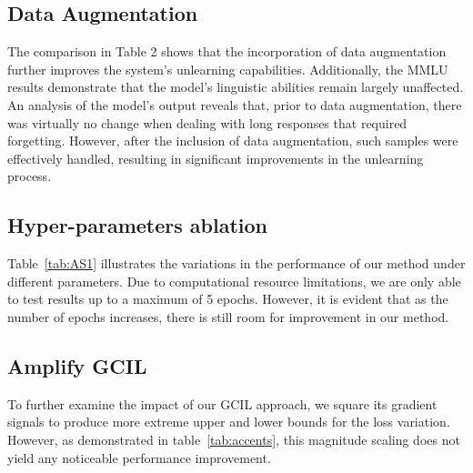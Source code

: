 \documentclass[11pt]{article}
\begin{document}
\subsection{Data Augmentation} 

The comparison in Table 2 shows that the incorporation of data augmentation further improves the system's unlearning capabilities. Additionally, the MMLU results demonstrate that the model’s linguistic abilities remain largely unaffected. An analysis of the model's output reveals that, prior to data augmentation, there was virtually no change when dealing with long responses that required forgetting. However, after the inclusion of data augmentation, such samples were effectively handled, resulting in significant improvements in the unlearning process.
\fi


\subsection{Hyper-parameters ablation}  

Table~\ref{tab:AS1} illustrates the variations in the performance of our method under different parameters. Due to computational resource limitations, we are only able to test results up to a maximum of 5 epochs. However, it is evident that as the number of epochs increases, there is still room for improvement in our method.


\subsection{Amplify GCIL} 
To further examine the impact of our GCIL approach, we square its gradient signals to produce more extreme upper and lower bounds for the loss variation. However, as demonstrated in table~\ref{tab:accents}, this magnitude scaling does not yield any noticeable performance improvement.
\end{document}

